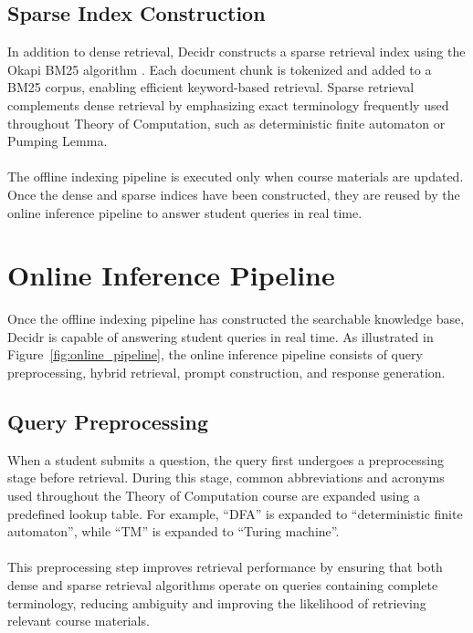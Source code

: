 \documentclass[12pt, a4paper]{report}
\begin{document}
\subsection{Sparse Index Construction}
In addition to dense retrieval, Decidr constructs a sparse retrieval index using the Okapi BM25 algorithm \cite{bm25okapi}. Each document chunk is tokenized and added to a BM25 corpus, enabling efficient keyword-based retrieval. Sparse retrieval complements dense retrieval by emphasizing exact terminology frequently used throughout Theory of Computation, such as deterministic finite automaton or Pumping Lemma.~\\~\\
The offline indexing pipeline is executed only when course materials are updated. Once the dense and sparse indices have been constructed, they are reused by the online inference pipeline to answer student queries in real time.
\section{Online Inference Pipeline}
Once the offline indexing pipeline has constructed the searchable knowledge base, Decidr is capable of answering student queries in real time. As illustrated in Figure~\ref{fig:online_pipeline}, the online inference pipeline consists of query preprocessing, hybrid retrieval, prompt construction, and response generation.
\subsection{Query Preprocessing}
When a student submits a question, the query first undergoes a preprocessing stage before retrieval. During this stage, common abbreviations and acronyms used throughout the Theory of Computation course are expanded using a predefined lookup table. For example, ``DFA'' is expanded to ``deterministic finite automaton'', while ``TM'' is expanded to ``Turing machine''.~\\~\\
This preprocessing step improves retrieval performance by ensuring that both dense and sparse retrieval algorithms operate on queries containing complete terminology, reducing ambiguity and improving the likelihood of retrieving relevant course materials.
\end{document}
